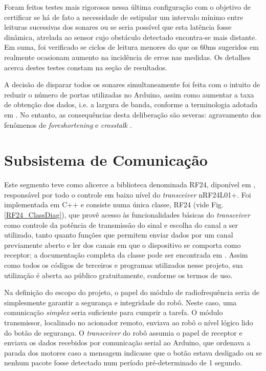 Foram feitos testes mais rigorosos nessa última configuração com o objetivo de certificar se há de fato a necessidade de estipular um intervalo 
mínimo entre leituras sucessivas dos sonares ou se seria possível que esta latência fosse dinâmica, atrelada ao sensor cujo obstáculo detectado 
encontra-se mais distante.
Em suma, foi verificado se ciclos de leitura menores do que os 60ms sugeridos em \cite{HC-SR04} realmente ocasionam aumento na incidência de erros 
nas medidas. Os detalhes acerca destes testes constam na seção de resultados.

A decisão de disparar todos os sonares simultaneamente foi feita com o intuito de reduzir o número de portas utilizadas no Arduino, assim como 
aumentar a taxa de obtenção dos dados, i.e. a largura de banda, conforme a terminologia adotada  em \cite{roseli}.
No entanto, as consequências desta deliberação são  severas: agravamento dos fenômenos de \textit{foreshortening} e \textit{crosstalk} 
\cite{2016_artigo_5}. %

\section{Subsistema de Comunicação}
Este segmento teve como alicerce a biblioteca denominada RF24, diponível em \cite{nrf_lib}, responsável por todo o controle em baixo nível do 
\textit{transceiver} nRF24L01+.
Foi implementada em C++ e consiste numa única classe, RF24 (vide Fig.\ref{RF24_ClassDiag}), que provê acesso às funcionalidades básicas do 
\textit{transceiver} como controle da potência de transmissão do sinal e escolha do canal a ser utilizado, tanto quanto funções que permitem enviar 
dados por um canal previamente aberto e ler dos canais em que o dispositivo se comporta como receptor; a documentação completa da classe pode ser 
encontrada em \cite{RF24_class_doc}.
Assim como todos os códigos de terceiros e programas utilizados nesse projeto, sua utilização é aberta ao público gratuitamente, conforme os termos 
de uso.

Na definição do escopo do projeto, o papel do módulo de radiofrequência seria de simplesmente garantir a segurança e integridade do robô.
Neste caso, uma comunicação \textit{simplex} seria suficiente para cumprir a tarefa.
O módulo transmissor, localizado no acionador remoto, enviava ao robô o nível lógico lido do botão de segurança.
O \textit{transceiver} do robô assumia o papel de receptor e enviava os dados recebidos por comunicação serial ao Arduino, que ordenava a parada dos 
motores caso a mensagem indicasse que o botão estava desligado ou se nenhum pacote fosse detectado num período pré-determinado de 1 segundo.

